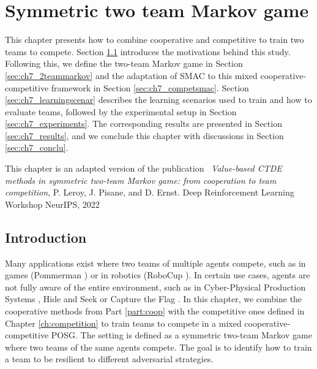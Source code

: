 \chapter{Symmetric two team Markov game}\label{ch:2teams}
\begin{chapter_outline}

This chapter presents how to combine cooperative and competitive to train two teams to compete.
Section \ref{sec:ch7_intro} introduces the motivations behind this study.
Following this, we define the two-team Markov game in Section \ref{sec:ch7_2teammarkov} and the adaptation of SMAC to this mixed cooperative-competitive framework in Section \ref{sec:ch7_competsmac}.
Section \ref{sec:ch7_learningscenar} describes the learning scenarios used to train and how to evaluate teams, followed by the experimental setup in Section \ref{sec:ch7_experiments}.
The corresponding results are presented in Section \ref{sec:ch7_results}, and we conclude this chapter with discussions in Section \ref{sec:ch7_conclu}.

This chapter is an adapted version of the publication~\citep{leroy2022twoteam} \textit{Value-based CTDE methods in symmetric two-team Markov game: from cooperation to team competition}, P. Leroy, J. Pisane, and D. Ernst. Deep Reinforcement Learning Workshop NeurIPS, 2022

\end{chapter_outline}

\section{Introduction} \label{sec:ch7_intro}

Many applications exist where two teams of multiple agents compete, such as in games (Pommerman \citep{resnick2018pommerman}) or in robotics (RoboCup \citep{kitano1997robocup}).
In certain use cases, agents are not fully aware of the entire environment, such as in Cyber-Physical Production Systems \citep{phan2020learning}, Hide and Seek \citep{baker2019emergent} or Capture the Flag \citep{jaderberg2019human}.
In this chapter, we combine the cooperative methods from Part \ref{part:coop} with the competitive ones defined in Chapter \ref{ch:competition} to train teams to compete in a mixed cooperative-competitive POSG.
The setting is defined as a symmetric two-team Markov game where two teams of the same agents compete.
The goal is to identify how to train a team to be resilient to different adversarial strategies.

